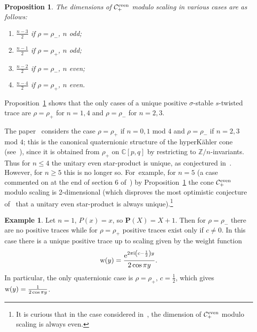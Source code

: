 \documentclass[pdftex]{sigma}
\newcommand{\mc}[1]{\mathcal{#1}}
\newtheorem{Proposition}[Theorem]{Proposition}
\theoremstyle{definition}
\newtheorem{Example}[Theorem]{Example}
\numberwithin{equation}{section}
\begin{document}
\begin{Proposition}\label{eve}
The dimensions
of $\mc C_+^{\rm even}$ modulo scaling in various cases are as follows:
\begin{enumerate}\itemsep=0pt
\item[$\bullet$] $\frac{n-3}{2}$ if $\rho=\rho_-$, $n$ odd;

\item[$\bullet$] $\frac{n-1}{2}$ if $\rho=\rho_+$, $n$ odd;

\item[$\bullet$] $\frac{n-2}{2}$ if $\rho=\rho_-$, $n$ even;

\item[$\bullet$] $\frac{n-4}{2}$ if $\rho=\rho_+$, $n$ even.
\end{enumerate}
\end{Proposition}

Proposition~\ref{eve} shows that the only cases of a unique positive
$\sigma$-stable $s$-twisted trace are $\rho=\rho_+$ for $n=1,4$ and $\rho=\rho_-$ for $n=2,3$.

The paper~\cite{BPR} considers the case $\rho=\rho_+$ if $n=0,1$ mod $4$
and $\rho=\rho_-$ if $n=2,3$ mod $4$; this is the canonical quaternionic structure of the hyperK\"ahler cone (see~\cite[Section~3.8]{ES}), since it is obtained from $\rho_+$ on $\mathbb C[p,q]$ by restricting to $\mathbb Z/n$-invariants. Thus for $n\le 4$ the unitary even star-product is unique, as conjectured in~\cite{BPR}. However, for $n\ge 5$ this is no longer so. For~example, for $n=5$ (a case commented on at the end of section 6 of~\cite{BPR}) by Proposition~\ref{eve} the cone $\mc C_+^{\rm even}$ modulo scaling is 2-dimensional (which disproves the most optimistic conjecture of~\cite{BPR} that a unitary even star-product is always unique).\footnote{It is curious that in the case considered in~\cite{BPR}, the dimension of $\mc C_+^{\rm even}$ modulo scaling is always even.}


\begin{Example} Let $n=1$, $P(x)=x$, so $\mathbf{P}(X)=X+1$.
Then for $\rho=\rho_-$ there are no positive traces while for $\rho=\rho_+$
positive traces exist only if $c\ne 0$. In this case there is a unique positive trace up to scaling given by the weight function
\[
{\rm w}(y)=\frac{{\rm e}^{2\pi {\rm i}\left(c-\frac{1}{2}\right)y}}{2\cos \pi y}.
\]
In particular, the only quaternionic case is $\rho=\rho_+$, $c=\frac{1}{2}$,
which gives ${\rm w}(y)=\frac{1}{2\cos \pi y}$.

\end{Example}
\end{document}
